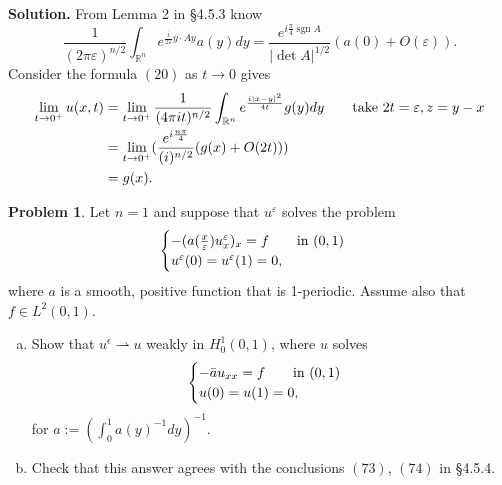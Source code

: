 \documentclass[a4paper]{book}
\newenvironment{solution}%
{\noindent\textbf{Solution.}}%
{\qedhere}
\numberwithin{equation}{chapter}
\theoremstyle{definition}
\newtheorem{pro}[exm]{Problem}
\begin{document}
\begin{solution}
  From Lemma 2 in \S4.5.3 know
  \[\frac{1}{(2\pi \varepsilon)^{n/2}} \int_{\mathbb{R}^n} e^{\frac{i}{2 \varepsilon} y \cdot Ay} a(y) dy = \frac{e^{i\frac{\pi}{4} \operatorname{sgn} A}}{\left| \det A \right|^{1/2}} (a(0) + O(\varepsilon)).\]
  Consider the formula $(20)$ as $t \rightarrow 0$ gives
  \begin{align*}
    \lim_{t \rightarrow 0^+} u(x,t) &= \lim_{t \rightarrow 0^+} \frac{1}{(4 \pi i t)^{n/2}} \int_{\mathbb{R}^n} e^{\frac{i \left| x - y \right|^2}{4t}} g(y) dy \qquad \textmd{take } 2t = \varepsilon, z = y -x \\
                                    &= \lim_{t \rightarrow 0^+} (\frac{e^{i\frac{n\pi}{4}}}{(i)^{n/2}}(g(x) + O(2t))) \\
    &= g(x).
  \end{align*}
\end{solution}

\begin{pro}
  Let $n = 1$ and  suppose that $u^\varepsilon$ solves the problem
  \begin{align*}
    \begin{cases}
      -(a(\frac{x}{\varepsilon})u_x^\varepsilon)_x = f \qquad \textmd{in } (0,1) \\
      u^\varepsilon(0) = u^\varepsilon(1) = 0,
    \end{cases}
  \end{align*}
  where $a$ is a smooth, positive function that is 1-periodic. Assume also that $f \in L^2(0,1)$.
  \begin{enumerate}[(a)]
  \item Show that $u^\epsilon \rightharpoonup u$ weakly in $H^1_0(0,1)$, where $u$ solves
    \begin{align*}
      \begin{cases}
        - \bar{a} u_{xx} = f \qquad \textmd{in } (0,1) \\
        u(0) = u(1) = 0,
      \end{cases}
    \end{align*}
    for $a := (\int^1_0 a(y)^{-1} dy)^{-1}$.

  \item Check that this answer agrees with the conclusions $(73)$, $(74)$ in \S4.5.4.
  \end{enumerate}
\end{pro}
\end{document}
